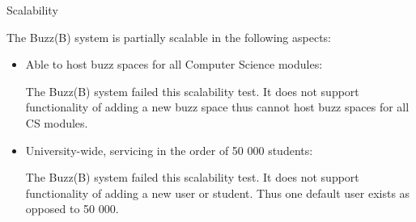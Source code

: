 \item Scalability

The Buzz(B) system is partially scalable in the following aspects:

\begin{itemize}
\item Able to host buzz spaces for all Computer Science modules:

The Buzz(B) system failed this scalability test. It does not support functionality of adding a new buzz space thus cannot host buzz spaces for all CS modules.

\item University-wide, servicing in the order of 50 000 students:

The Buzz(B) system failed this scalability test. It does not support functionality of adding a new user or student. Thus one default user exists as opposed to 50 000.
\end{itemize}